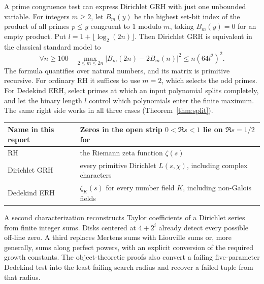 \thispagestyle{plain}
\noindent{\sffamily\small\textcolor{accent}{MATHEMATICAL LOGIC \quad / \quad ANALYTIC NUMBER THEORY}}\par
\vspace{9pt}
\vspace{7pt}
\par
\vspace{5pt}\par
\bigskip
A prime congruence test can express Dirichlet GRH with just one unbounded variable. For integers $m\ge2$, let $B_m(y)$ be the highest set-bit index of the product of all primes $p\le y$ congruent to $1$ modulo $m$, taking $B_m(y)=0$ for an empty product. Put $l=1+\lfloor\log_2(2n)\rfloor$. Then Dirichlet GRH is equivalent in the classical standard model to
\[
 \boxed{\quad \forall n\ge100\quad
   \max_{2\le m\le2n}|B_m(2n)-2B_m(n)|^2\le n(64l^2)^2.\quad}
\]
The formula quantifies over natural numbers, and its matrix is primitive recursive. For ordinary RH it suffices to use $m=2$, which selects the odd primes. For Dedekind ERH, select primes at which an input polynomial splits completely, and let the binary length $l$ control which polynomials enter the finite maximum. The same right side works in all three cases (Theorem~\ref{thm:split}).
\begin{center}\small
\begin{tabular}{@{}ll@{}}\toprule
Name in this report & Zeros in the open strip $0<\Re s<1$ lie on $\Re s=1/2$ for\\\midrule
RH & the Riemann zeta function $\zeta(s)$\\
Dirichlet GRH & every primitive Dirichlet $L(s,\chi)$, including complex characters\\
Dedekind ERH & $\zeta_K(s)$ for every number field $K$, including non-Galois fields\\\bottomrule
\end{tabular}
\end{center}
A second characterization reconstructs Taylor coefficients of a Dirichlet series from finite integer sums. Disks centered at $4+2^i$ already detect every possible off-line zero. A third replaces Mertens sums with Liouville sums or, more generally, sums along perfect powers, with an explicit conversion of the required growth constants. The object-theoretic proofs also convert a failing five-parameter Dedekind test into the least failing search radius and recover a failed tuple from that radius.
